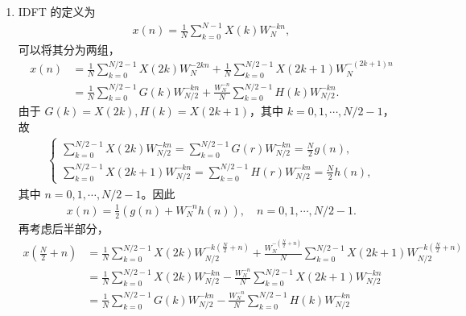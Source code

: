 \begin{solution}
    \begin{enumerate}[label=(\arabic*)]
        \item IDFT 的定义为
            \begin{align*}
                x(n) = \frac{1}{N}\sum_{k = 0}^{N - 1}X(k)W_N^{-kn},
            \end{align*}
            可以将其分为两组，
            \begin{align*}
                x(n) & = \frac{1}{N}\sum_{k = 0}^{N/2 - 1}X(2k)W_N^{-2kn}
                    + \frac{1}{N}\sum_{k = 0}^{N/2 - 1}X(2k + 1)W_N^{-(2k + 1)n} \\
                & = \frac{1}{N}\sum_{k = 0}^{N/2 - 1}G(k)W_{N/2}^{-kn}
                    + \frac{W_N^{-n}}{N}\sum_{k = 0}^{N/2 - 1}H(k)W_{N/2}^{-kn}.
            \end{align*}
            由于 $G(k) = X(2k), H(k) = X(2k + 1)$，其中 $k = 0, 1, \cdots, N / 2 - 1$，故
            \begin{align*}
                \begin{cases}
                    \sum_{k = 0}^{N/2 - 1}X(2k)W_{N/2}^{-kn}
                        = \sum_{k = 0}^{N/2 - 1}G(r)W_{N/2}^{-kn} = \frac{N}{2}g(n), \\
                    \sum_{k = 0}^{N/2 - 1}X(2k + 1)W_{N/2}^{-kn}
                        = \sum_{k = 0}^{N/2 - 1}H(r)W_{N/2}^{-kn} = \frac{N}{2}h(n),
                \end{cases}
            \end{align*}
            其中 $n = 0, 1, \cdots, N/2 - 1$。因此
            \begin{align*}
                x(n) = \frac{1}{2}\left(g(n) + W_N^{-n}h(n)\right), \quad n = 0, 1, \cdots, N / 2 - 1.
            \end{align*}
            再考虑后半部分，
            \begin{align*}
                x\left(\frac{N}{2} + n\right) & = \frac{1}{N}\sum_{k = 0}^{N/2 - 1}X(2k)W_{N/2}^{-k\left(\frac{N}{2} + n\right)}
                    + \frac{W_N^{-\left(\frac{N}{2} + n\right)}}{N}\sum_{k = 0}^{N/2 - 1}X(2k + 1)W_{N/2}^{-k\left(\frac{N}{2} + n\right)} \\
                & = \frac{1}{N}\sum_{k = 0}^{N/2 - 1}X(2k)W_{N/2}^{-kn}
                    - \frac{W_N^{-n}}{N}\sum_{k = 0}^{N/2 - 1}X(2k + 1)W_{N/2}^{-kn} \\
                & = \frac{1}{N}\sum_{k = 0}^{N/2 - 1}G(k)W_{N/2}^{-kn}
                    - \frac{W_N^{-n}}{N}\sum_{k = 0}^{N/2 - 1}H(k)W_{N/2}^{-kn} \\

\end{align*}
\end{enumerate}
\end{solution}

